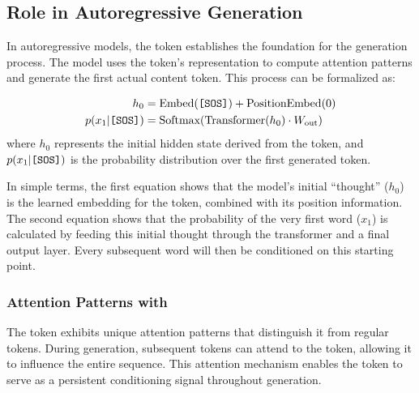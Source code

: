 \subsection{Role in Autoregressive Generation}

In autoregressive models, the \sos{} token establishes the foundation for the generation process. The model uses the \sos{} token's representation to compute attention patterns and generate the first actual content token. This process can be formalized as:

\begin{align}
h_0 &= \text{Embed}(\text{\texttt{[SOS]}{}}) + \text{PositionEmbed}(0) \\
p(x_1 | \text{\texttt{[SOS]}{}}) &= \text{Softmax}(\text{Transformer}(h_0) \cdot W_{\text{out}})
\end{align}
where $h_0$ represents the initial hidden state derived from the \sos{} token, and $p(x_1 | \text{\texttt{[SOS]}{}})$ is the probability distribution over the first generated token.

In simple terms, the first equation shows that the model's initial ``thought'' ($h_0$) is the learned embedding for the \sos{} token, combined with its position information. The second equation shows that the probability of the very first word ($x_1$) is calculated by feeding this initial thought through the transformer and a final output layer. Every subsequent word will then be conditioned on this starting point.

\subsubsection{Attention Patterns with \sos{}}

The \sos{} token exhibits unique attention patterns that distinguish it from regular tokens. During generation, subsequent tokens can attend to the \sos{} token, allowing it to influence the entire sequence. This attention mechanism enables the \sos{} token to serve as a persistent conditioning signal throughout generation.

